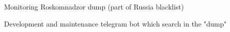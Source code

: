 \documentclass[]{schorscv}
\begin{document}
\begin{minipage}[t]{0.70\textwidth}
\begin{tightemize}
\item Monitoring Roskomnadzor dump (part of Russia blacklist)
\item Development and maintenance telegram bot which search in the "dump"
\end{tightemize}
\sectionsep



%
%

\end{minipage} 
\hfill
\end{document}
